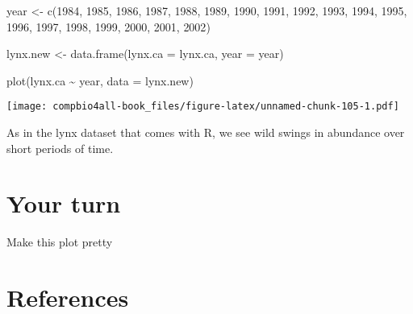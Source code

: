 \documentclass[
]{book}
\newenvironment{Shaded}{\begin{snugshade}}{\end{snugshade}}
\newcommand{\AttributeTok}[1]{\textcolor[rgb]{0.77,0.63,0.00}{#1}}
\newcommand{\DecValTok}[1]{\textcolor[rgb]{0.00,0.00,0.81}{#1}}
\newcommand{\FunctionTok}[1]{\textcolor[rgb]{0.00,0.00,0.00}{#1}}
\newcommand{\NormalTok}[1]{#1}
\newcommand{\OtherTok}[1]{\textcolor[rgb]{0.56,0.35,0.01}{#1}}
\newcommand{\SpecialCharTok}[1]{\textcolor[rgb]{0.00,0.00,0.00}{#1}}
\begin{document}
\begin{Shaded}
\begin{Highlighting}[]
\NormalTok{year }\OtherTok{\textless{}{-}} \FunctionTok{c}\NormalTok{(}\DecValTok{1984}\NormalTok{, }\DecValTok{1985}\NormalTok{, }\DecValTok{1986}\NormalTok{, }\DecValTok{1987}\NormalTok{,}
          \DecValTok{1988}\NormalTok{, }\DecValTok{1989}\NormalTok{, }\DecValTok{1990}\NormalTok{, }\DecValTok{1991}\NormalTok{, }\DecValTok{1992}\NormalTok{, }
          \DecValTok{1993}\NormalTok{, }\DecValTok{1994}\NormalTok{, }\DecValTok{1995}\NormalTok{, }\DecValTok{1996}\NormalTok{, }\DecValTok{1997}\NormalTok{,}
          \DecValTok{1998}\NormalTok{, }\DecValTok{1999}\NormalTok{, }\DecValTok{2000}\NormalTok{, }\DecValTok{2001}\NormalTok{, }\DecValTok{2002}\NormalTok{)}
\end{Highlighting}
\end{Shaded}

\begin{Shaded}
\begin{Highlighting}[]
\NormalTok{lynx.new }\OtherTok{\textless{}{-}} \FunctionTok{data.frame}\NormalTok{(}\AttributeTok{lynx.ca =}\NormalTok{ lynx.ca,}
                       \AttributeTok{year =}\NormalTok{ year)}
\end{Highlighting}
\end{Shaded}

\begin{Shaded}
\begin{Highlighting}[]
\FunctionTok{plot}\NormalTok{(lynx.ca }\SpecialCharTok{\textasciitilde{}}\NormalTok{ year, }\AttributeTok{data =}\NormalTok{ lynx.new)}
\end{Highlighting}
\end{Shaded}

\texttt{[image: compbio4all-book\_files/figure-latex/unnamed-chunk-105-1.pdf]}

As in the lynx dataset that comes with R, we see wild swings in abundance over short periods of time.

\hypertarget{your-turn-2}{%
\section{Your turn}\label{your-turn-2}}

Make this plot pretty

\hypertarget{references-2}{%
\section{References}\label{references-2}}
\end{document}
